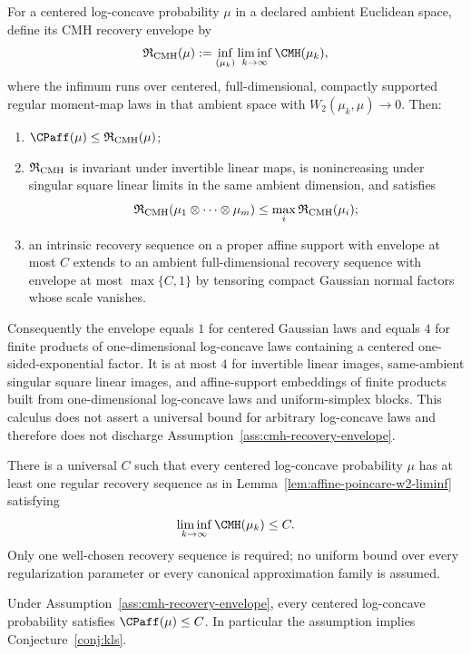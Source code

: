 \documentclass[../../main.tex]{subfiles}
\begin{document}
\begin{proposition}
\label{prop:cmh-recovery-calculus}
For a centered log-concave probability $\mu$ in a declared ambient Euclidean space, define its
CMH recovery envelope by
\[
  \mathfrak R_{\rm CMH}(\mu)
  :=\inf_{(\mu_k)}
       \liminf_{k\to\infty}\CMH(\mu_k),
\]
where the infimum runs over centered, full-dimensional, compactly supported regular moment-map
laws in that ambient space with $W_2(\mu_k,\mu)\to0$. Then:
\begin{enumerate}[label=(\roman*),leftmargin=2.8em]
  \item $\CPaff(\mu)\le\mathfrak R_{\rm CMH}(\mu)$;
  \item $\mathfrak R_{\rm CMH}$ is invariant under invertible linear maps, is nonincreasing
  under singular square linear limits in the same ambient dimension, and satisfies
  \[
    \mathfrak R_{\rm CMH}(\mu_1\otimes\cdots\otimes\mu_m)
    \le\max_i\mathfrak R_{\rm CMH}(\mu_i);
  \]
  \item an intrinsic recovery sequence on a proper affine support with envelope at most $C$
  extends to an ambient full-dimensional recovery sequence with envelope at most
  $\max\{C,1\}$ by tensoring compact Gaussian normal factors whose scale vanishes.
\end{enumerate}
Consequently the envelope equals $1$ for centered Gaussian laws and equals $4$ for finite
products of one-dimensional log-concave laws containing a centered one-sided-exponential
factor. It is at most $4$ for invertible linear images, same-ambient singular square linear
images, and affine-support embeddings of finite products built from one-dimensional
log-concave laws and uniform-simplex blocks. This calculus does not assert a universal bound for
arbitrary log-concave laws and therefore does not discharge
Assumption~\ref{ass:cmh-recovery-envelope}.
\end{proposition}

\begin{assumption}
\label{ass:cmh-recovery-envelope}
There is a universal $C$ such that every centered log-concave probability $\mu$ has at least one
regular recovery sequence as in Lemma~\ref{lem:affine-poincare-w2-liminf} satisfying
\[
  \liminf_{k\to\infty}\CMH(\mu_k)\le C.
\]
Only one well-chosen recovery sequence is required; no uniform bound over every regularization
parameter or every canonical approximation family is assumed.
\end{assumption}

\begin{corollary}
\label{cor:cmh-recovery-sequence-suffices}
Under Assumption~\ref{ass:cmh-recovery-envelope}, every centered log-concave probability satisfies
$\CPaff(\mu)\le C$.  In particular the assumption implies Conjecture~\ref{conj:kls}.
\end{corollary}
\end{document}
